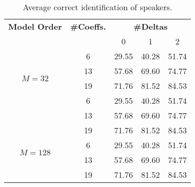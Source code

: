 \begin{table}[h]
    \centering
    \begin{tabular}{|c|c|c|c|c|}
        \hline
        \textbf{Model Order} & \textbf{\#Coeffs.} \multirow{2}{*} & \multicolumn{3}{c|}{\textbf{\#Deltas}} \\ \cline{3-5}
        & & 0 & 1 & 2 \\
        \hline
        \multirow{4}{*}{$M = 32$} & 6 & 29.55 & 40.28 & 51.74 \\ \cline{2-5}
        & 13 & 57.68 & 69.60 & 74.77 \\ \cline{2-5}
        & 19 & 71.76 & 81.52 & 84.53 \\ \cline{2-5}
        \hline
        \multirow{3}{*}{$M = 64$} & 6 & 29.55 & 40.28 & 51.74 \\ \cline{2-5}
        & 13 & 57.68 & 69.60 & 74.77 \\ \cline{2-5}
        & 19 & 71.76 & 81.52 & 84.53 \\ \cline{2-5}
        \hline
        \multirow{2}{*}{$M = 128$} & 6 & 29.55 & 40.28 & 51.74 \\ \cline{2-5}
        & 13 & 57.68 & 69.60 & 74.77 \\ \cline{2-5}
        & 19 & 71.76 & 81.52 & 84.53 \\ \cline{2-5}
        \hline
    \end{tabular}
    \caption{Average correct identification of speakers.}
    \label{table:avg-correctness}
\end{table}

